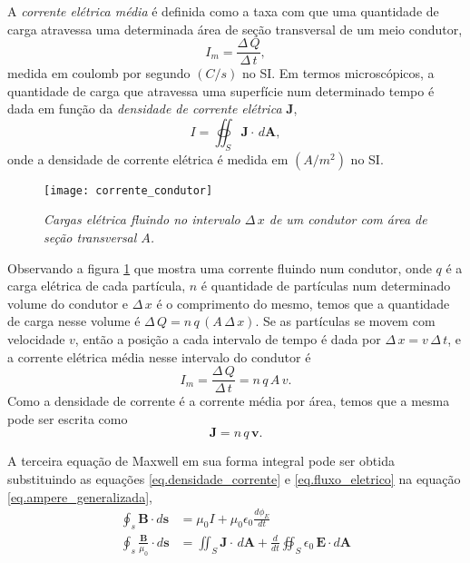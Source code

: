 A \textit{corrente elétrica média} é definida como a taxa com que uma quantidade de carga atravessa uma determinada área de seção transversal de um meio condutor,
\begin{equation*}
I_m=\frac{\Delta\,Q}{\Delta\,t},
\end{equation*}
medida em coulomb por segundo $(C/s)$ no SI. Em termos microscópicos, a quantidade de carga que atravessa uma superfície num determinado tempo é dada em função da \textit{densidade de corrente elétrica} $\mathbf{J}$,
\begin{equation}\label{eq.densidade_corrente}
I=\oiint_S\mathbf{J}\cdot\,d\mathbf{A},
\end{equation}
onde a densidade de corrente elétrica é medida em $(A/m^2)$ no SI. 
\begin{figure}
\centering
\texttt{[image: corrente\_condutor]}
\caption{\textit{Cargas elétrica fluindo no intervalo $\Delta\,x$ de um condutor com área de seção transversal $A$.}}
\label{fig.corre_condu}
\end{figure}
Observando a figura \ref{fig.corre_condu} que mostra uma corrente fluindo num condutor, onde $q$ é a carga elétrica de cada partícula, $n$ é quantidade de partículas num determinado volume do condutor e $\Delta\,x$ é o comprimento do mesmo, temos que a quantidade de carga nesse volume é $\Delta\,Q=n\,q\,(A\,\Delta\,x)$. Se as partículas se movem com velocidade $v$, então a posição a cada intervalo de tempo é dada por $\Delta\,x=v\,\Delta\,t$, e a corrente elétrica média nesse intervalo do condutor é
\begin{equation*}
I_m=\frac{\Delta\,Q}{\Delta\,t}=n\,q\,A\,v.
\end{equation*}
Como a densidade de corrente é a corrente média por área, temos que a mesma pode ser escrita como 
\begin{equation*}
\mathbf{J}=n\,q\,\mathbf{v}.
\end{equation*}

A terceira equação de Maxwell em sua forma integral pode ser obtida substituindo as equações \ref{eq.densidade_corrente} e \ref{eq.fluxo_eletrico} na equação \ref{eq.ampere_generalizada},
\begin{align*}
\oint_s\mathbf{B}\cdot d\mathbf{s}&=\mu_0I+\mu_0\epsilon_0\frac{d\phi_E}{dt}\\
\oint_s\frac{\mathbf{B}}{\mu_0}\cdot d\mathbf{s}&=\iint_S\mathbf{J}\cdot\,d\mathbf{A}+\frac{d}{dt}\oiint_S\epsilon_0\,\textbf{E}\cdot\textit{d}\textbf{A}
\end{align*}

